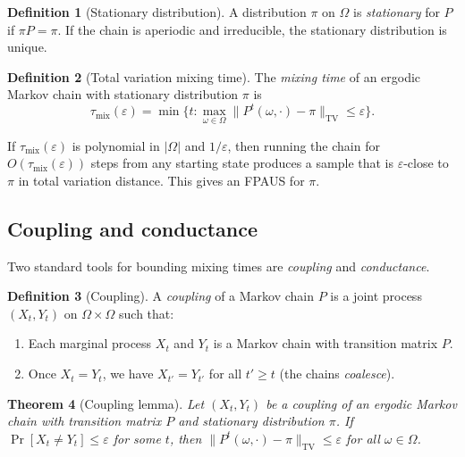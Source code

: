 \documentclass[twoside,12pt]{book}
\theoremstyle{plain}
\newtheorem{theorem}{Theorem}[chapter]
\theoremstyle{definition}
\newtheorem{definition}[theorem]{Definition}
\theoremstyle{remark}
\begin{document}
\begin{definition}[Stationary distribution]
A distribution $\pi$ on $\Omega$ is \emph{stationary} for $P$ if $\pi P = \pi$. If the chain is aperiodic and irreducible, the stationary distribution is unique.
\end{definition}

\begin{definition}[Total variation mixing time]
The \emph{mixing time} of an ergodic Markov chain with stationary distribution $\pi$ is
\[
\tau_{\mathrm{mix}}(\varepsilon) = \min\!\bigl\{ t : \max_{\omega \in \Omega} \bigl\| P^t(\omega, \cdot) - \pi \bigr\|_{\mathrm{TV}} \leq \varepsilon \bigr\}.
\]
\end{definition}

If $\tau_{\mathrm{mix}}(\varepsilon)$ is polynomial in $|\Omega|$ and $1/\varepsilon$, then running the chain for $O(\tau_{\mathrm{mix}}(\varepsilon))$ steps from any starting state produces a sample that is $\varepsilon$-close to $\pi$ in total variation distance. This gives an FPAUS for $\pi$.

\subsection{Coupling and conductance}

Two standard tools for bounding mixing times are \emph{coupling} and \emph{conductance}.

\begin{definition}[Coupling]
A \emph{coupling} of a Markov chain $P$ is a joint process $(X_t, Y_t)$ on $\Omega \times \Omega$ such that:
\begin{enumerate}[nosep]
    \item Each marginal process $X_t$ and $Y_t$ is a Markov chain with transition matrix $P$.
    \item Once $X_t = Y_t$, we have $X_{t'} = Y_{t'}$ for all $t' \geq t$ (the chains \emph{coalesce}).
\end{enumerate}
\end{definition}

\begin{theorem}[Coupling lemma]
\label{thm:coupling}
Let $(X_t, Y_t)$ be a coupling of an ergodic Markov chain with transition matrix $P$ and stationary distribution $\pi$. If $\Pr[X_t \neq Y_t] \leq \varepsilon$ for some $t$, then $\|P^t(\omega, \cdot) - \pi\|_{\mathrm{TV}} \leq \varepsilon$ for all $\omega \in \Omega$.
\end{theorem}
\end{document}
